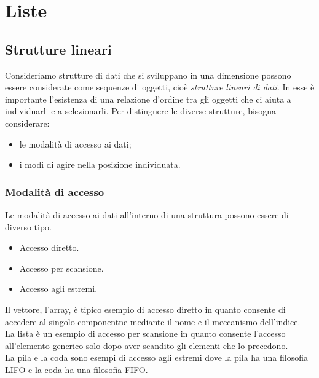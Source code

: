 \documentclass[12pt]{report}
\begin{document}
	\chapter{Liste}
	\section{Strutture lineari}
	Consideriamo strutture di dati che si sviluppano in una dimensione possono essere considerate come sequenze di oggetti, cioè \textit{strutture lineari di dati}. In esse è importante l'esistenza di una relazione d'ordine tra gli oggetti che ci aiuta a individuarli e a selezionarli. Per distinguere le diverse strutture, bisogna considerare:
	\begin{itemize}
		\item le modalità di accesso ai dati;
		\item i modi di agire nella posizione individuata.
	\end{itemize}
	\subsection{Modalità di accesso}
	Le modalità di accesso ai dati all'interno di una struttura possono essere di diverso tipo.
	\begin{itemize}
		\item Accesso diretto.
		\item Accesso per scansione.
		\item Accesso agli estremi.
	\end{itemize}
	Il vettore, l'array, è tipico esempio di accesso diretto in quanto consente di accedere al singolo componentne mediante il nome e il meccanismo dell'indice. \\
	La lista è un esempio di accesso per scansione in quanto consente l'accesso all'elemento generico solo dopo aver scandito gli elementi che lo precedono. \\
	La pila e la coda sono esempi di accesso agli estremi dove la pila ha una filosofia LIFO e la coda ha una filosofia FIFO.
\end{document}
